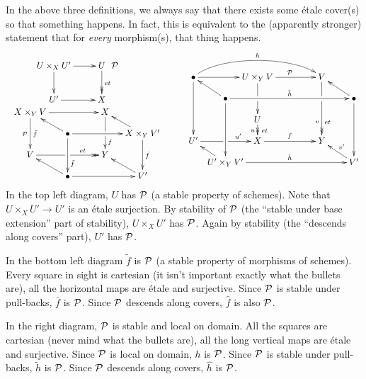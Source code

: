  \begin{remark}\label{lec12R:exists_etale<=>any_map}
   In the above three definitions, we always say that there exists some \'etale cover(s)
   so that something happens. In fact, this is equivalent to the (apparently stronger)
   statement that for \emph{every} morphism(s), that thing happens.
   \[\begin{tabular}{c}
    \xymatrix{
    U\times_X U' \ar[r] \ar[d] & U \rlap{\ \ $\P$}\ar@{->>}[d]^{et}\\
    U' \ar[r] & X
   }\hspace*{3em}\\
   \xymatrix@!0 @C+1.5pc {
    X\times_Y V \ar[dd]^{\tilde f}_\P \ar[rr] & & X \ar[dd]|\hole^(.7)f\\
    & \bullet \ar[ul] \ar[rr] \ar[dd]^(.7){\bar f} & & X\times_Y V' \ar[dd]^{\hat f} \ar[ul] \\
    V\ar@{->>}[rr]^(.7){et}|\hole & & Y\\
    & \bullet \ar[rr] \ar[ul] & & V' \ar[ul]
   }\end{tabular}\qquad
   \raisebox{4pc}{$\xymatrix@!0 @C+1pc{
    \bullet \ar@(ur,ul)[rrrr]^h \ar[ddd]\ar[rr]& & U\times_Y V \ar[dd]|\hole \ar[rr]^<>(.35)\P
        & & V\ar@{->>}[ddd]_(.7)v^(.7){et}|!{[dl];[dr]}\hole\\
    & \bullet \ar[ul] \ar[rrrr]^{\tilde h} \ar[ddd] & & & & \bullet \ar[ddd] \ar[ul]\\
    & & U \ar@{->>}[d]_u^{\,et}\\
    U'\ar[rr]|\hole^(.7){u'} & & X\ar[rr]^f & & Y\\
    & U'\times_Y V' \ar[ul]\ar[rrrr]^{\hat h} & & & & V'\ar[ul]_{v'}
   }$}
   \]
    In the top left diagram, $U$ has $\P$ (a stable property of schemes). Note that
   $U\times_X U'\to U'$ is an \'etale surjection. By stability of $\P$ (the ``stable under
   base extension'' part of stability), $U\times_X U'$ has $\P$. Again by stability (the
   ``descends along covers'' part), $U'$ has $\P$.


   In the bottom left diagram $\tilde f$ is $\P$ (a stable property of morphisms of
   schemes). Every square in sight is cartesian (it isn't important exactly what the
   bullets are), all the horizontal maps are \'etale and surjective. Since $\P$ is stable
   under pull-backs, $\bar f$ is $\P$. Since $\P$ descends along covers, $\hat f$ is also
   $\P$.

   In the right diagram, $\P$ is stable and local on domain. All the squares are
   cartesian (never mind what the bullets are), all the long vertical maps are \'etale
   and surjective. Since $\P$ is local on domain, $h$ is $\P$. Since $\P$ is stable under
   pull-backs, $\tilde h$ is $\P$. Since $\P$ descends along covers, $\hat h$ is $\P$.
 \end{remark}
